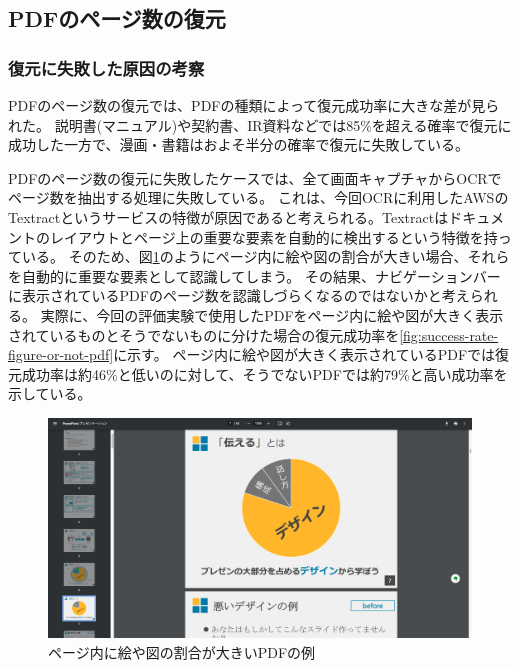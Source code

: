 
\subsection{PDFのページ数の復元}

\subsubsection{復元に失敗した原因の考察}
PDFのページ数の復元では、PDFの種類によって復元成功率に大きな差が見られた。
説明書(マニュアル)や契約書、IR資料などでは85\%を超える確率で復元に成功した一方で、漫画・書籍はおよそ半分の確率で復元に失敗している。

PDFのページ数の復元に失敗したケースでは、全て画面キャプチャからOCRでページ数を抽出する処理に失敗している。
これは、今回OCRに利用したAWSのTextractというサービスの特徴が原因であると考えられる。Textractはドキュメントのレイアウトとページ上の重要な要素を自動的に検出するという特徴を持っている。
そのため、図\ref{fig:example-figure-pdf}\cite{example-pdf}のようにページ内に絵や図の割合が大きい場合、それらを自動的に重要な要素として認識してしまう。
その結果、ナビゲーションバーに表示されているPDFのページ数を認識しづらくなるのではないかと考えられる。
実際に、今回の評価実験で使用したPDFをページ内に絵や図が大きく表示されているものとそうでないものに分けた場合の復元成功率を\ref{fig:success-rate-figure-or-not-pdf}に示す。
ページ内に絵や図が大きく表示されているPDFでは復元成功率は約46\%と低いのに対して、そうでないPDFでは約79\%と高い成功率を示している。

\begin{figure}[htbp]
  \label{fig:example-figure-pdf}
  \begin{center}
    \includegraphics[bb=0 0 1918 998,width=15cm]{img/060_evaluation/consideration/pdf/example/example-pdf.pdf}
  \end{center}
  \caption{ページ内に絵や図の割合が大きいPDFの例}
\end{figure}

